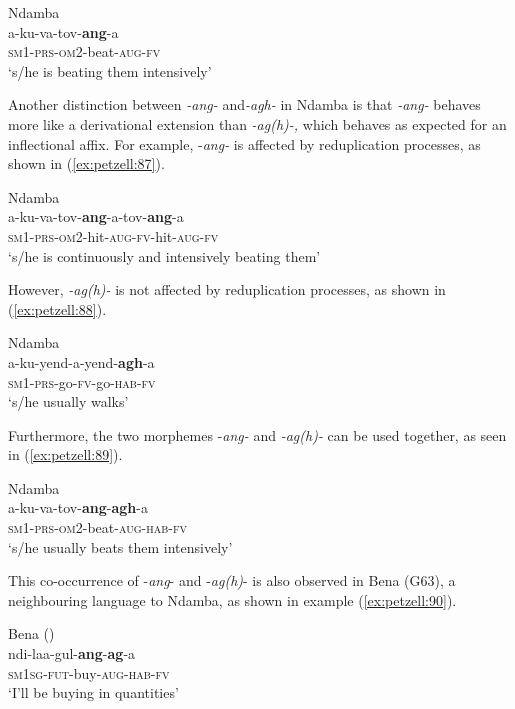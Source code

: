 \documentclass[output=paper,
            colorlinks, citecolor=brown
            ,draftmode
		  ]{langscibook}
\begin{document}
\ex\label{ex:petzell:86}Ndamba\\
\gll a-ku-va-tov-\textbf{ang}{}-a  \\
\textsc{sm}1-\textsc{prs}{}-\textsc{om}2-beat-\textsc{{aug}}{}-\textsc{fv}\\
\glt `s/he is beating them intensively'
\z


Another distinction between \textit{{}-ang-} and\textit{{}-agh-} in Ndamba is that \textit{{}-ang-} behaves more like a derivational extension than \textit{{}-ag(h)-,} which behaves as expected for an inflectional affix. For example, -\textit{ang-} is affected by reduplication processes, as shown in  (\ref{ex:petzell:87}). 


\ea\label{ex:petzell:87}Ndamba\\
\gll a-ku-va-tov-\textbf{ang}{}-a-tov-\textbf{ang}{}-a  \\
\textsc{sm}1-\textsc{prs}{}-\textsc{om}2-hit-\textsc{{aug}}{}-\textsc{fv}{}-hit-\textsc{{aug}}{}-\textsc{fv}\\
\glt `s/he is continuously and intensively beating them'
\z


However, \textit{{}-ag(h)-} is not affected by reduplication processes, as shown in  (\ref{ex:petzell:88}).


\ea\label{ex:petzell:88}Ndamba\\
\gll a-ku-yend-a-yend-\textbf{agh}{}-a  \\
\textsc{sm}1-\textsc{prs}{}-go-\textsc{fv}{}-go-\textsc{{hab}}{}-\textsc{fv}\\
\glt `s/he usually walks'
\z


Furthermore, the two morphemes -\textit{ang-} and \textit{-ag(h)-} can be used together, as seen in  (\ref{ex:petzell:89}).


\ea\label{ex:petzell:89}Ndamba\\
\gll a-ku-va-tov-\textbf{ang}{}-\textbf{agh}{}-a \\ 
\textsc{sm}1-\textsc{prs}{}-\textsc{om}2-beat-\textsc{{aug}}{}-\textsc{{hab}}{}-\textsc{fv}\\
\glt `s/he usually beats them intensively'
\z


This co-occurrence of -\textit{ang}{}- and -\textit{ag(h)}{}- is also observed in Bena (G63), a neighbouring language to Ndamba, as shown in example (\ref{ex:petzell:90}).


\ea\label{ex:petzell:90}Bena (\citealt[37]{Nurse2008})\\
\gll ndi-laa-gul-\textbf{ang}{}-\textbf{ag}{}-a \\
\textsc{sm}1\textsc{sg}{}-\textsc{fut}{}-buy-\textsc{{aug}}{}-\textsc{{hab}}{}-\textsc{fv}\\
\glt `I'll be buying in quantities'
\z
\end{document}
